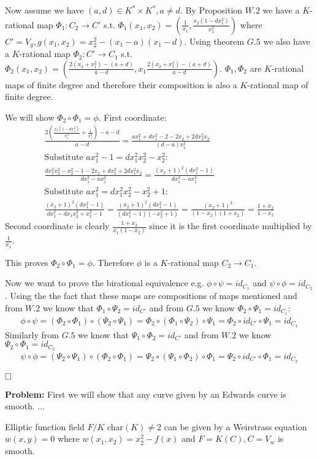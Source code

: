 \documentclass[12pt, a4paper]{article}
\newcommand{\qed}{\hfill\square}
\begin{document}
Now assume we have $(a,d) \in K^* \times K^*, a\neq d$. By Proposition $W.2$ we have a $K$-rational map $\Phi_1: C_2 \rightarrow C'$ s.t. $\Phi_1(x_1,x_2) = \left(\frac{1}{x_1}, \frac{x_2(1-dx_1^2)}{x_1^2} \right)$ where $C' = V_g, g(x_1,x_2) = x_2^2-(x_1-a)(x_1-d)$. Using theorem $G.5$ we also have a $K$-rational map $\Phi_2: C' \rightarrow C_1$ s.t. $\Phi_2(x_1,x_2) = \left( \frac{2(x_2+x_1^2)-(a+d)}{a-d}, x_1\frac{2(x_2+x_1^2)-(a+d)}{a-d}\right)$. $\Phi_1, \Phi_2$ are $K$-rational maps of finite degree and therefore their composition is also a $K$-rational map of finite degree.

We will show $\Phi_2 \circ \Phi_1 = \phi$. First coordinate:
\begin{gather*}
\frac{2\left(\frac{x_2(1-dx_1^2)}{x_1^2}+\frac{1}{x_1^2}\right)-a-d}{a-d} = \frac{ax_1^2+dx_1^2-2-2x_2+2dx_1^2x_2}{(d-a)x_1^2}\\
\text{Substitute $ax_1^2-1 = dx_1^2x_2^2-x_2^2$:}\\
\frac{dx_1^2x_2^2-x_2^2-1-2x_2+dx_1^2+2dx_1^2x_2}{dx_1^2-ax_1^2} = \frac{(x_2+1)^2(dx_1^2-1)}{dx_1^2-ax_1^2}\\
\text{Substitute $ax_1^2 = dx_1^2x_2^2-x_2^2+1$:}\\
\frac{(x_2+1)^2(dx_1^2-1)}{dx_1^2-dx_1x_2^2+x_2^2-1} = \frac{(x_2+1)^2(dx_1^2-1)}{(dx_1^2-1)(-x_2^2+1)} = \frac{(x_2+1)^2}{(1-x_2)(1+x_2)} = \frac{1+x_2}{1-x_2}
\end{gather*}
Second coordinate is clearly $\frac{1+x_2}{x_1(1-x_2)}$ since it is the first coordinate multiplied by $\frac{1}{x_1}$.

This proves $\Phi_2 \circ \Phi_1 = \phi$. Therefore $\phi$ is a $K$-rational map $C_2 \rightarrow C_1$.

Now we want to prove the birational equivalence e.g. $\phi \circ \psi = id_{C_1}$ and $\psi \circ \phi = id_{C_2}$. Using the the fact that these maps are compositions of maps mentioned and from $W.2$ we know that $\Phi_1 \circ \Psi_2 = id_{C'}$ and from $G.5$ we know $\Phi_2 \circ \Psi_1 = id_{C_1}$:
\begin{gather*}
\phi \circ \psi = (\Phi_2 \circ \Phi_1) \circ (\Psi_2 \circ \Psi_1) = \Phi_2 \circ (\Phi_1 \circ \Psi_2) \circ \Psi_1 = \Phi_2 \circ id_{C'} \circ \Psi_1 = id_{C_1}
\end{gather*}
Similarly from $G.5$ we know that $\Psi_1 \circ \Phi_2 = id_{C'}$ and from $W.2$ we know $\Psi_2 \circ \Phi_1 = id_{C_2}$
\begin{gather*}
\psi \circ \phi =  (\Psi_2 \circ \Psi_1) \circ (\Phi_2 \circ \Phi_1) = \Psi_2 \circ (\Psi_1 \circ \Phi_2) \circ \Phi_1 = \Psi_2 \circ id_{C'} \circ \Phi_1 = id_{C_2}
\end{gather*}

$\qed$

\textbf{Problem:}
First we will show that any curve given by an Edwards curve is smooth.
...

Elliptic function field $F/K$ char$(K)\neq 2$ can be given by a Weirstrass equation $w(x,y)=0$ where $w(x_1,x_2) = x_2^2-f(x)$ and $F=K(C), C=V_w$ is smooth.
\end{document}
